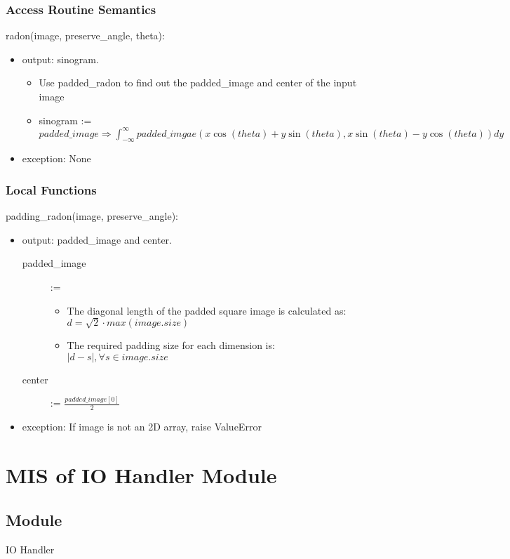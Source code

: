 \documentclass[12pt, titlepage]{article}
\begin{document}
\subsubsection{Access Routine Semantics}


\noindent
radon(image, preserve\_angle, theta):
\begin{itemize}
\item output: sinogram.
\begin{itemize}
    \item Use padded\_radon to find out the padded\_image and center of the input
      image
      \item sinogram := \(padded\_image \Rightarrow \int_{-\infty}^{\infty} padded\_imgae(x\cos(theta) + y\sin(theta),
        x\sin(theta) - y\cos(theta))dy\)
\end{itemize}
\item exception: None
\end{itemize}

\subsubsection{Local Functions}
\noindent
padding\_radon(image, preserve\_angle):
\begin{itemize}
\item output: padded\_image and center.
  \begin{description}
    \item[padded\_image] :=
      \begin{itemize}
      \item The diagonal length of the padded square image is calculated as:
        \(d = \sqrt{2}\cdot max(image.size)\)
      \item The required padding size for each dimension is: \(|d - s|, \forall s \in image.size\)
      \end{itemize}
    \item[center] := \(\frac{padded\_image[0]}{2}\)
  \end{description}
\item exception: If image is not an 2D array, raise ValueError
\end{itemize}

\newpage
\section{MIS of IO Handler Module} \label{ModuleIO}

\subsection{Module}
IO Handler
\end{document}
